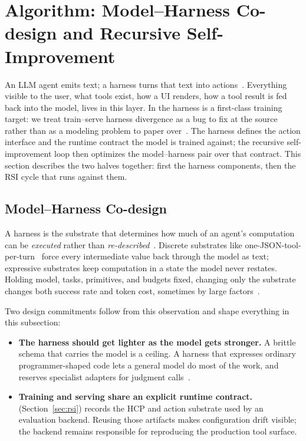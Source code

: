 \section{Algorithm: Model--Harness Co-design and Recursive Self-Improvement}
\label{sec:algorithm}

An LLM agent emits text; a harness turns that text into actions~\citep{wu2026replharnesses}. Everything visible to the user, what tools exist, how a UI renders, how a tool result is fed back into the model, lives in this layer. In \macaron{} the harness is a first-class training target: we treat train--serve harness divergence as a bug to fix at the source rather than as a modeling problem to paper over~\citep{macaron_v1_preview2026}. The harness defines the action interface and the runtime contract the model is trained against; the recursive self-improvement loop then optimizes the model--harness pair over that contract. This section describes the two halves together: first the harness components, then the RSI cycle that runs against them.

\subsection{Model--Harness Co-design}
\label{sec:harness}
\label{sec:harness_matters}

A harness is the substrate that determines how much of an agent's computation can be \emph{executed} rather than \emph{re-described}~\citep{wu2026replharnesses,codeact2024}. Discrete substrates like one-JSON-tool-per-turn~\citep{patil2025berkeley} force every intermediate value back through the model as text; expressive substrates keep computation in a state the model never restates. Holding model, tasks, primitives, and budgets fixed, changing only the substrate changes both success rate and token cost, sometimes by large factors~\citep{wu2026replharnesses}.

Two design commitments follow from this observation and shape everything in this subsection:
\begin{itemize}[leftmargin=*]
  \item \textbf{The harness should get lighter as the model gets stronger.} A brittle schema that carries the model is a ceiling. A harness that expresses ordinary programmer-shaped code lets a general model do most of the work, and reserves specialist adapters for judgment calls~\citep{ui4a2026}.
  \item \textbf{Training and serving share an explicit runtime contract.} \mindforge{} (Section~\ref{sec:rsi}) records the HCP and action substrate used by an evaluation backend. Reusing those artifacts makes configuration drift visible; the backend remains responsible for reproducing the production tool surface.
\end{itemize}


